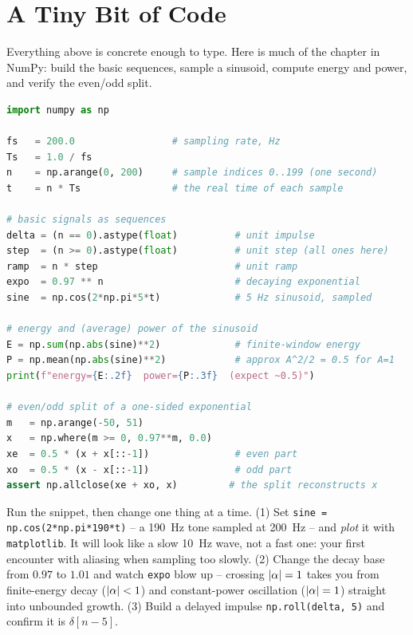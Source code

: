 \section{A Tiny Bit of Code}
\label{ch02:code}

Everything above is concrete enough to type. Here is much of the chapter in NumPy:
build the basic sequences, sample a sinusoid, compute energy and power, and verify
the even/odd split.

\begin{lstlisting}[language=Python]
import numpy as np

fs   = 200.0                 # sampling rate, Hz
Ts   = 1.0 / fs
n    = np.arange(0, 200)     # sample indices 0..199 (one second)
t    = n * Ts                # the real time of each sample

# basic signals as sequences
delta = (n == 0).astype(float)          # unit impulse
step  = (n >= 0).astype(float)          # unit step (all ones here)
ramp  = n * step                        # unit ramp
expo  = 0.97 ** n                       # decaying exponential
sine  = np.cos(2*np.pi*5*t)             # 5 Hz sinusoid, sampled

# energy and (average) power of the sinusoid
E = np.sum(np.abs(sine)**2)             # finite-window energy
P = np.mean(np.abs(sine)**2)            # approx A^2/2 = 0.5 for A=1
print(f"energy={E:.2f}  power={P:.3f}  (expect ~0.5)")

# even/odd split of a one-sided exponential
m   = np.arange(-50, 51)
x   = np.where(m >= 0, 0.97**m, 0.0)
xe  = 0.5 * (x + x[::-1])               # even part
xo  = 0.5 * (x - x[::-1])               # odd part
assert np.allclose(xe + xo, x)         # the split reconstructs x
\end{lstlisting}

\begin{labbox}
Run the snippet, then change one thing at a time. (1) Set \texttt{sine =
np.cos(2*np.pi*190*t)} -- a 190~Hz tone sampled at 200~Hz -- and \emph{plot} it with
\texttt{matplotlib}. It will look like a slow 10~Hz wave, not a fast one: your first
encounter with aliasing when sampling too slowly. (2) Change the decay base from
$0.97$ to $1.01$ and watch \texttt{expo} blow up -- crossing $\lvert\alpha\rvert=1$ takes
you from finite-energy decay ($\lvert\alpha\rvert<1$) and constant-power oscillation
($\lvert\alpha\rvert=1$) straight into unbounded growth. (3) Build a delayed impulse
\texttt{np.roll(delta, 5)} and confirm it is $\delta[n-5]$.
\end{labbox}

